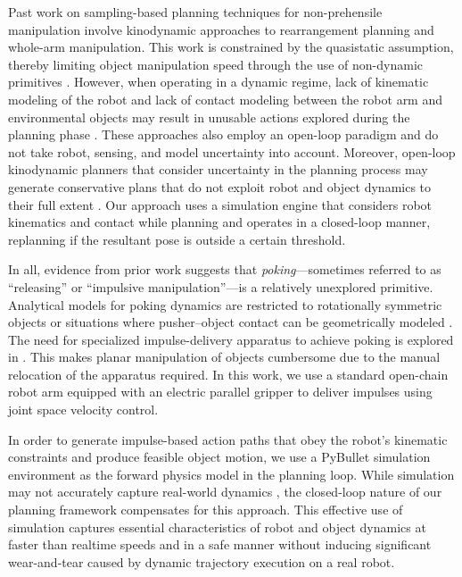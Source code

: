 Past work on sampling-based planning techniques for non-prehensile manipulation involve kinodynamic approaches to rearrangement planning and whole-arm manipulation. This work is constrained by the quasistatic assumption, thereby limiting object manipulation speed through the use of non-dynamic primitives \cite{king2015nonprehensile}. However, when operating in a dynamic regime, lack of kinematic modeling of the robot and lack of contact modeling between the robot arm and environmental objects may result in unusable actions explored during the planning phase \cite{haustein2015kinodynamic}. These approaches also employ an open-loop paradigm and do not take robot, sensing, and model uncertainty into account. Moreover, open-loop kinodynamic planners that consider uncertainty in the planning process may generate conservative plans that do not exploit robot and object dynamics to their full extent \cite{8207585}. Our approach uses a simulation engine that considers robot kinematics and contact while planning and operates in a closed-loop manner, replanning if the resultant pose is outside a certain threshold.

In all, evidence from prior work suggests that \textsl{poking}---sometimes referred to as ``releasing'' or ``impulsive manipulation''---is a relatively unexplored primitive. Analytical models for poking dynamics are restricted to rotationally symmetric objects or situations where pusher--object contact can be geometrically modeled \cite{Huang-1997-14452, zhu2005frictional}. The need for specialized impulse-delivery apparatus to achieve poking is explored in \cite{Huang-1997-14452}. This makes planar manipulation of objects cumbersome due to the manual relocation of the apparatus required. In this work, we use a standard open-chain robot arm equipped with an electric parallel gripper to deliver impulses using joint space velocity control.

In order to generate impulse-based action paths that obey the robot's kinematic constraints and produce feasible object motion, we use a PyBullet \cite{coumans2019} simulation environment as the forward physics model in the planning loop.
While simulation may not accurately capture real-world dynamics \cite{collins2019quantifying}, the closed-loop nature of our planning framework compensates for this approach. This effective use of simulation captures essential characteristics of robot and object dynamics at faster than realtime speeds and in a safe manner without inducing significant wear-and-tear caused by dynamic trajectory execution on a real robot.

